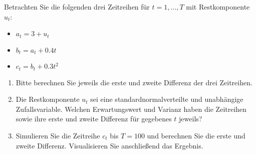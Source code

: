 
Betrachten Sie die folgenden drei Zeitreihen für $t = 1,\dots,T$ mit Restkomponente $u_t$:
\begin{itemize}
    \item $a_t = 3 + u_t$
    \item $b_t = a_t + 0.4t$
    \item $c_t = b_t + 0.3t^2$
\end{itemize}

\begin{enumerate}
    
\item Bitte berechnen Sie jeweils die erste und zweite Differenz der drei Zeitreihen.


\item Die Restkomponente $u_t$ sei eine standardnormalverteilte und unabhängige Zufallsvariable. Welchen Erwartungswert und Varianz haben die Zeitreihen sowie ihre erste und zweite Differenz für gegebenes $t$ jeweils?


\item Simulieren Sie die Zeitreihe $c_t$ bis $T = 100$ und berechnen Sie die erste und zweite Differenz. Visualisieren Sie anschließend das Ergebnis.


\end{enumerate}


